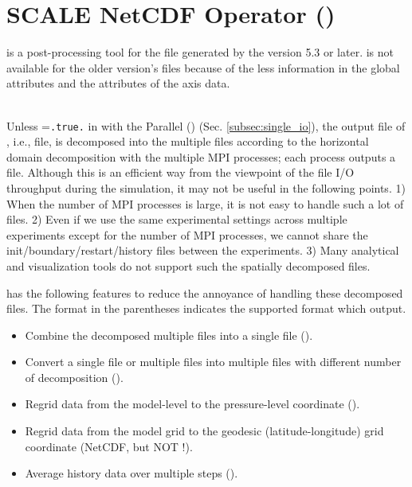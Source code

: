 \section{SCALE NetCDF Operator (\sno)} \label{sec:sno}

 \hrulefill

\sno is a post-processing tool for the \scalenetcdf file generated by the \scalelib version 5.3 or later.
\sno is not available for the older version's \scalenetcdf files
because of the less information in the global attributes and the attributes of the axis data.

\noindent \hrulefill\\


Unless =\verb|.true.| in  with the Parallel \netcdf (\pnetcdf) (Sec. \ref{subsec:single_io}),
the output file of \scalerm, i.e., \scalenetcdf file, is decomposed into the multiple files
according to the horizontal domain decomposition with the multiple MPI processes; each process outputs a file.
Although this is an efficient way from the viewpoint of the file I/O throughput during the simulation,
it may not be useful in the following points.
%
1) When the number of MPI processes is large, it is not easy to handle such a lot of files.
2) Even if we use the same experimental settings across multiple experiments except for the number of MPI processes, we cannot share the init/boundary/restart/history files between the experiments.
3) Many analytical and visualization tools do not support such the spatially decomposed files.


\sno has the following features to reduce the annoyance of handling these decomposed files.
The format in the parentheses indicates the supported format which \sno output.
\begin{itemize}
 \item Combine the decomposed multiple files into a single file (\scalenetcdf).
 \item Convert a single file or multiple files into multiple files with different number of decomposition (\scalenetcdf).
 \item Regrid data from the model-level to the pressure-level coordinate (\scalenetcdf).
 \item Regrid data from the model grid to the geodesic (latitude-longitude) grid coordinate (NetCDF, but NOT \scalenetcdf !).
 \item Average history data over multiple steps (\scalenetcdf).
\end{itemize}



